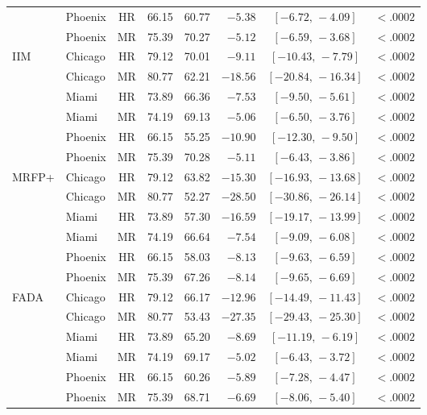 \begin{table}[h]
\begin{tabular}{@{}llcrrrcr@{}}
          & Phoenix & HR & 66.15 & 60.77 & $-5.38$  & $[-6.72,\,-4.09]$   & $<\!.0002$ \\
          & Phoenix & MR & 75.39 & 70.27 & $-5.12$  & $[-6.59,\,-3.68]$   & $<\!.0002$ \\
\cmidrule(l){1-8}
IIM       & Chicago & HR & 79.12 & 70.01 & $-9.11$  & $[-10.43,\,-7.79]$  & $<\!.0002$ \\
          & Chicago & MR & 80.77 & 62.21 & $-18.56$ & $[-20.84,\,-16.34]$ & $<\!.0002$ \\
          & Miami   & HR & 73.89 & 66.36 & $-7.53$  & $[-9.50,\,-5.61]$   & $<\!.0002$ \\
          & Miami   & MR & 74.19 & 69.13 & $-5.06$  & $[-6.50,\,-3.76]$   & $<\!.0002$ \\
          & Phoenix & HR & 66.15 & 55.25 & $-10.90$ & $[-12.30,\,-9.50]$  & $<\!.0002$ \\
          & Phoenix & MR & 75.39 & 70.28 & $-5.11$  & $[-6.43,\,-3.86]$   & $<\!.0002$ \\
\cmidrule(l){1-8}
MRFP+     & Chicago & HR & 79.12 & 63.82 & $-15.30$ & $[-16.93,\,-13.68]$ & $<\!.0002$ \\
          & Chicago & MR & 80.77 & 52.27 & $-28.50$ & $[-30.86,\,-26.14]$ & $<\!.0002$ \\
          & Miami   & HR & 73.89 & 57.30 & $-16.59$ & $[-19.17,\,-13.99]$ & $<\!.0002$ \\
          & Miami   & MR & 74.19 & 66.64 & $-7.54$  & $[-9.09,\,-6.08]$   & $<\!.0002$ \\
          & Phoenix & HR & 66.15 & 58.03 & $-8.13$  & $[-9.63,\,-6.59]$   & $<\!.0002$ \\
          & Phoenix & MR & 75.39 & 67.26 & $-8.14$  & $[-9.65,\,-6.69]$   & $<\!.0002$ \\
\cmidrule(l){1-8}
FADA      & Chicago & HR & 79.12 & 66.17 & $-12.96$ & $[-14.49,\,-11.43]$ & $<\!.0002$ \\
          & Chicago & MR & 80.77 & 53.43 & $-27.35$ & $[-29.43,\,-25.30]$ & $<\!.0002$ \\
          & Miami   & HR & 73.89 & 65.20 & $-8.69$  & $[-11.19,\,-6.19]$  & $<\!.0002$ \\
          & Miami   & MR & 74.19 & 69.17 & $-5.02$  & $[-6.43,\,-3.72]$   & $<\!.0002$ \\
          & Phoenix & HR & 66.15 & 60.26 & $-5.89$  & $[-7.28,\,-4.47]$   & $<\!.0002$ \\
          & Phoenix & MR & 75.39 & 68.71 & $-6.69$  & $[-8.06,\,-5.40]$   & $<\!.0002$ \\

\end{tabular}
\end{table}
